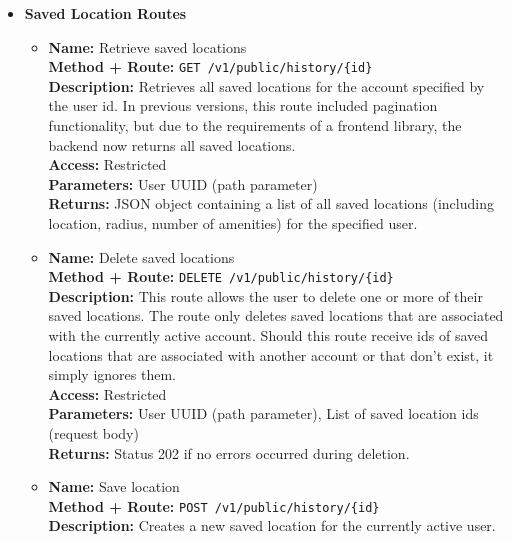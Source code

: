 \begin{itemize}
{\begin{itemize}
{        }
    \end{itemize}
  }
  \item{
    \textbf{Saved Location Routes}
    \begin{itemize}
      \item {
        \textbf{Name:} Retrieve saved locations\\
        \textbf{Method + Route:} \texttt{GET /v1/public/history/\{id\}}\\
        \textbf{Description:} Retrieves all saved locations for the account
        specified by the user id. In previous versions, this route included
        pagination functionality, but due to the requirements of a frontend
        library, the backend now returns all saved locations.\\
        \textbf{Access:} Restricted\\
        \textbf{Parameters:} User UUID (path parameter)\\
        \textbf{Returns:} JSON object containing a list of all saved locations
        (including location, radius, number of amenities) for the specified
        user.\\
      }
      \item {
        \textbf{Name:} Delete saved locations\\
        \textbf{Method + Route:} \texttt{DELETE /v1/public/history/\{id\}}\\
        \textbf{Description:} This route allows the user to delete one or more
        of their saved locations. The route only deletes saved locations that
        are associated with the currently active account. Should this route
        receive ids of saved locations that are associated with another account
        or that don't exist, it simply ignores them.\\
        \textbf{Access:} Restricted\\
        \textbf{Parameters:} User UUID (path parameter), List of saved location
        ids (request body)\\
        \textbf{Returns:} Status 202 if no errors occurred during deletion.\\
      }
      \newpage{}
      \item {
        \textbf{Name:} Save location\\
        \textbf{Method + Route:} \texttt{POST /v1/public/history/\{id\}}\\
        \textbf{Description:} Creates a new saved location for the currently
        active user.\\
}
\end{itemize}}
\end{itemize}
